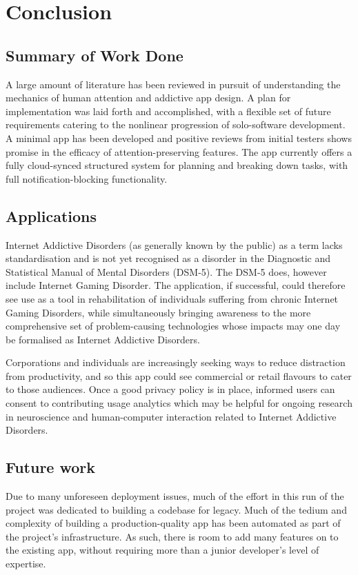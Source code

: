 \chapter{Conclusion}
\label{ch:conclusions}

\section{Summary of Work Done}
A large amount of literature has been reviewed in pursuit of understanding the mechanics of human attention and addictive app design. A plan for implementation was laid forth and accomplished, with a flexible set of future requirements catering to the nonlinear progression of solo-software development. A minimal app has been developed and positive reviews from initial testers shows promise in the efficacy of attention-preserving features. The app currently offers a fully cloud-synced structured system for planning and breaking down tasks, with full notification-blocking functionality.

\section{Applications}
Internet Addictive Disorders (as generally known by the public) as a term lacks standardisation and is not yet recognised as a disorder in the Diagnostic and Statistical Manual of Mental Disorders (DSM-5). The DSM-5 does, however include Internet Gaming Disorder. The application, if successful, could therefore see use as a tool in rehabilitation of individuals suffering from chronic Internet Gaming Disorders, while simultaneously bringing awareness to the more comprehensive set of problem-causing technologies whose impacts may one day be formalised as Internet Addictive Disorders.

Corporations and individuals are increasingly seeking ways to reduce distraction from productivity, and so this app could see commercial or retail flavours to cater to those audiences. Once a good privacy policy is in place, informed users can consent to contributing usage analytics which may be helpful for ongoing research in neuroscience and human-computer interaction related to Internet Addictive Disorders.

\section{Future work}
Due to many unforeseen deployment issues, much of the effort in this run of the project was dedicated to building a codebase for legacy. Much of the tedium and complexity of building a production-quality app has been automated as part of the project's infrastructure. As such, there is room to add many features on to the existing app, without requiring more than a junior developer's level of expertise.

